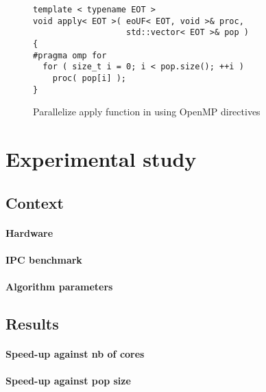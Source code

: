 \documentclass{sig-alternate}
\begin{document}

\begin{figure}[here]
\centering
\begin{verbatim}
template < typename EOT >
void apply< EOT >( eoUF< EOT, void >& proc,
                   std::vector< EOT >& pop )
{
#pragma omp for
  for ( size_t i = 0; i < pop.size(); ++i )
    proc( pop[i] );
}
\end{verbatim}
\caption{Parallelize apply function in using OpenMP directives}
\end{figure}

\section{Experimental study}

\subsection{Context}

\paragraph{Hardware} %
\paragraph{IPC benchmark} %
\paragraph{Algorithm parameters} %

\subsection{Results}



\paragraph{Speed-up against nb of cores} %
\paragraph{Speed-up against pop size} %
\end{document}
